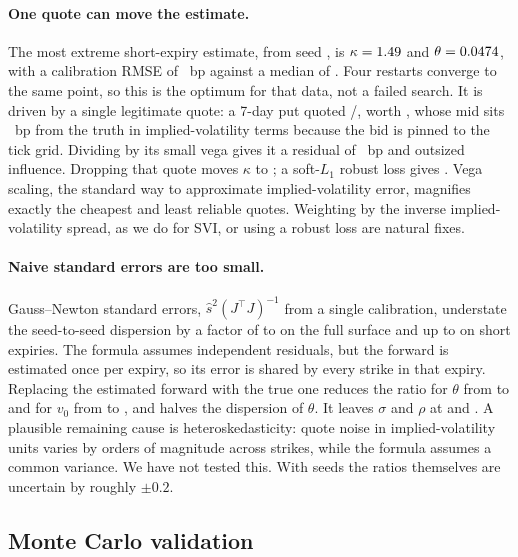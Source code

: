 \documentclass[11pt]{article}
\theoremstyle{remark}
\begin{document}
\paragraph{One quote can move the estimate.}
The most extreme short-expiry estimate, from seed \OSeed, is $\kappa = 1.49$ and $\theta = 0.0474$, with a calibration RMSE of \ORmse~bp against a median of \ORmseMed.
Four restarts converge to the same point, so this is the optimum for that data, not a failed search.
It is driven by a single legitimate quote: a 7-day \OStrike{} put quoted \OBid/\OAsk, worth \OTrue, whose mid sits \OMidErr~bp from the truth in implied-volatility terms because the bid is pinned to the tick grid.
Dividing by its small vega gives it a residual of \OResid~bp and outsized influence.
Dropping that quote moves $\kappa$ to \ODropKappa; a soft-$L_1$ robust loss gives \ORobKappa.
Vega scaling, the standard way to approximate implied-volatility error, magnifies exactly the cheapest and least reliable quotes.
Weighting by the inverse implied-volatility spread, as we do for SVI, or using a robust loss are natural fixes.

\paragraph{Naive standard errors are too small.}
Gauss--Newton standard errors, $\hat s^2 (J^\top J)^{-1}$ from a single calibration, understate the seed-to-seed dispersion by a factor of \BRatioMinFull{} to \BRatioMaxFull{} on the full surface and up to \BRatioMaxShort{} on short expiries.
The formula assumes independent residuals, but the forward is estimated once per expiry, so its error is shared by every strike in that expiry.
Replacing the estimated forward with the true one reduces the ratio for $\theta$ from \BRatioThetaFull{} to \BRatioThetaTF{} and for $v_0$ from \BRatioVzeroFull{} to \BRatioVzeroTF{}, and halves the dispersion of $\theta$.
It leaves $\sigma$ and $\rho$ at \BRatioSigmaTF{} and \BRatioRhoTF.
A plausible remaining cause is heteroskedasticity: quote noise in implied-volatility units varies by orders of magnitude across strikes, while the formula assumes a common variance.
We have not tested this.
With \BSeeds{} seeds the ratios themselves are uncertain by roughly $\pm 0.2$.

\subsection{Monte Carlo validation}
\end{document}
